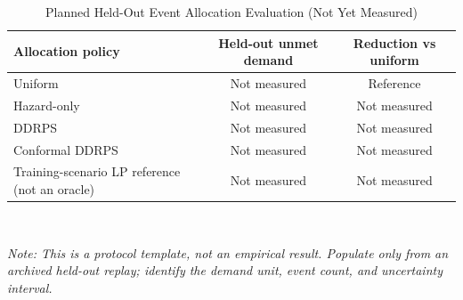 \begin{table}[htbp]
\caption{Planned Held-Out Event Allocation Evaluation (Not Yet Measured)}
\label{tab:strategy_comparison}
\centering
\begin{tabular}{|l|c|c|}
\hline
\textbf{Allocation policy} & \textbf{Held-out unmet demand} & \textbf{Reduction vs uniform} \\ \hline
Uniform & Not measured & Reference \\ \hline
Hazard-only & Not measured & Not measured \\ \hline
DDRPS & Not measured & Not measured \\ \hline
Conformal DDRPS & Not measured & Not measured \\ \hline
Training-scenario LP reference (not an oracle) & Not measured & Not measured \\ \hline
\end{tabular}
\\[4pt]
\begin{minipage}{\linewidth}
\footnotesize
\textit{Note: This is a protocol template, not an empirical result. Populate only from an archived held-out replay; identify the demand unit, event count, and uncertainty interval.}
\end{minipage}
\end{table}
